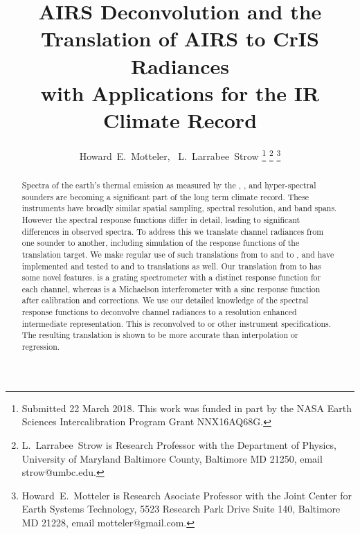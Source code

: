 \documentclass[journal]{IEEEtran}
\begin{document}
\title{AIRS Deconvolution and the \\
       Translation of AIRS to CrIS Radiances \\ 
       with Applications for the IR Climate Record}

\author{Howard~E.~Motteler,~
  L.~Larrabee~Strow
\thanks{Submitted 22 March 2018.  This work was funded in part by
  the NASA Earth Sciences Intercalibration Program Grant
  NNX16AQ68G.}%
\thanks{L.~Larrabee~Strow is Research Professor with the Department
  of Physics, University of Maryland Baltimore County, Baltimore MD
  21250, email strow@umbc.edu.}%
\thanks{Howard~E.~Motteler is Research Asociate Professor with the
  Joint Center for Earth Systems Technology, 5523 Research Park
  Drive Suite 140, Baltimore MD 21228, email motteler@gmail.com.}}

\maketitle

\begin{abstract}

Spectra of the earth's thermal emission as measured by the {\airs},
{\cris}, and {\iasi} hyper-spectral sounders are becoming a
significant part of the long term climate record.  These instruments
have broadly similar spatial sampling, spectral resolution, and band
spans.  However the spectral response functions differ in detail,
leading to significant differences in observed spectra.  To address
this we translate channel radiances from one sounder to another,
including simulation of the response functions of the translation
target.  We make regular use of such translations from {\airs} to
{\cris} and {\iasi} to {\cris}, and have implemented and tested
{\iasi} to {\airs} and {\cris} to {\airs} translations as well.  
Our translation from {\airs} to {\cris} has some novel features.
{\airs} is a grating spectrometer with a distinct response function
for each channel, whereas {\cris} is a Michaelson interferometer with
a sinc response function after calibration and corrections.  We use
our detailed knowledge of the {\airs} spectral response functions to
deconvolve {\airs} channel radiances to a resolution enhanced
intermediate representation.  This is reconvolved to {\cris} or
other instrument specifications.  The resulting translation is shown
to be more accurate than interpolation or regression.

\end{abstract}
\end{document}

